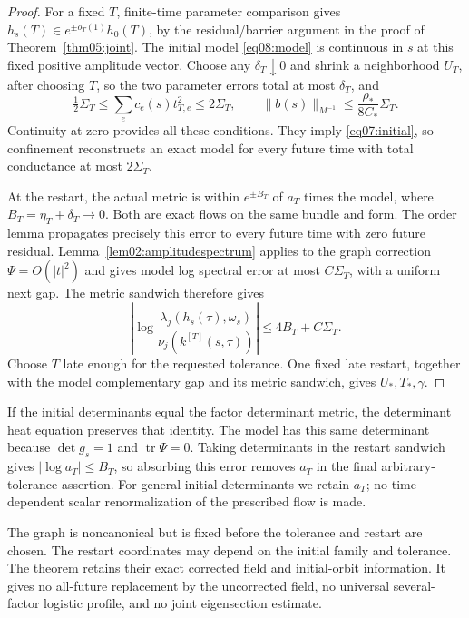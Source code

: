 \documentclass[11pt]{amsart}
\theoremstyle{definition}
\theoremstyle{remark}
\newcommand{\tr}{\operatorname{tr}}
\begin{document}
\begin{proof}
For a fixed \(T\), finite-time parameter comparison gives
\(h_s(T)\in e^{\pm o_T(1)}h_0(T)\), by the residual/barrier
argument in the proof of Theorem~\ref{thm05:joint}. The initial
model \eqref{eq08:model} is continuous in \(s\) at this fixed
positive amplitude vector. Choose any \(\delta_T\downarrow0\)
and shrink a neighborhood \(U_T\), after choosing \(T\), so the
two parameter errors total at most \(\delta_T\), and
\begin{equation}\label{eq08:restart}
 \tfrac12\Sigma_T\le\sum_ec_e(s)t_{T,e}^2\le2\Sigma_T,\qquad
 \|b(s)\|_{M^{-1}}\le\frac{\rho_*}{8C_*}\Sigma_T.
\end{equation}
Continuity at zero provides all these conditions. They imply
\eqref{eq07:initial}, so confinement reconstructs an exact model
for every future time with total conductance at most \(2\Sigma_T\).

At the restart, the actual metric is within
\(e^{\pm B_T}\) of \(a_T\) times the model, where
\(B_T=\eta_T+\delta_T\to0\). Both are exact flows on the
same bundle and form. The order lemma propagates precisely this
error to every future time with zero future residual.
Lemma~\ref{lem02:amplitudespectrum} applies to the graph correction
\(\Psi=O(|t|^2)\) and gives model log spectral error at most
\(C\Sigma_T\), with a uniform next gap. The metric sandwich
therefore gives
\begin{equation}\label{eq08:error}
 \left|\log\frac{\lambda_j(h_s(\tau),\omega_s)}
                             {\nu_j(k^{[T]}(s,\tau))}\right|
       \le4B_T+C\Sigma_T.
\end{equation}
Choose \(T\) late enough for the requested tolerance. One fixed
late restart, together with the model complementary gap and its
metric sandwich, gives \(U_*,T_*,\gamma\).
\end{proof}

If the initial determinants equal the factor determinant metric,
the determinant heat equation preserves that identity. The model
has this same determinant because \(\det g_s=1\) and
\(\tr\Psi=0\). Taking determinants in the restart sandwich gives
\(|\log a_T|\le B_T\), so absorbing this error removes \(a_T\)
in the final arbitrary-tolerance assertion. For general initial
determinants we retain \(a_T\); no time-dependent scalar
renormalization of the prescribed flow is made.

The graph is noncanonical but is fixed before the tolerance and
restart are chosen. The restart coordinates may depend on the
initial family and tolerance. The theorem retains their
exact corrected field and initial-orbit information. It gives no
all-future replacement by the uncorrected field, no universal
several-factor logistic profile, and no joint eigensection estimate.
\end{document}
